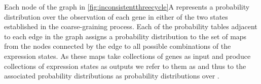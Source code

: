Each node of the graph in \ref{fig:inconsistentthreecycle}A represents a probability distribution over the observation of each gene in either of the two states established in the coarse-graining process.
Each of the probability tables adjacent to each edge in the graph assigns a probability distribution to the set of maps from the nodes connected by the edge to all possible combinations of the expression states. As these maps take collections of genes as input and produce collections of expression states as outputs we refer to them as \gnpm{} and thus to the associated probability distributions as probability distributions over \gnpm{}.

